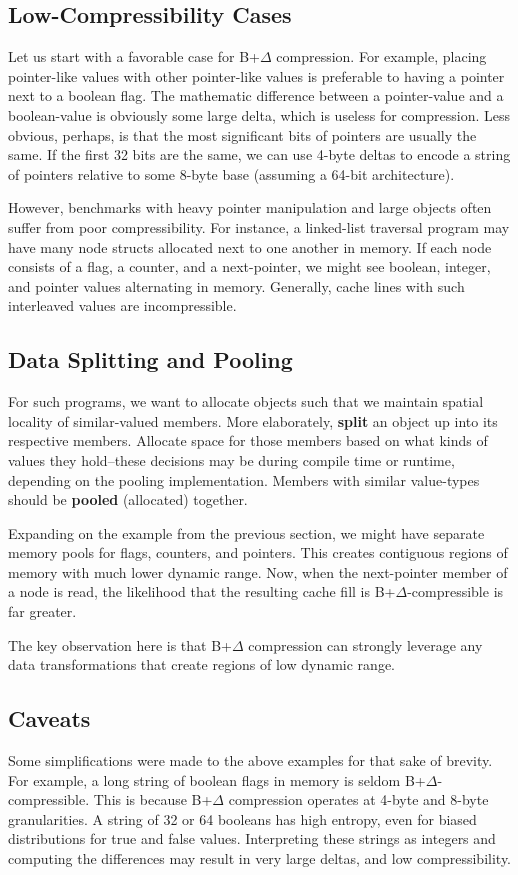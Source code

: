 \documentclass[pageno]{jpaper}
\begin{document}
\subsection{Low-Compressibility Cases}

Let us start with a favorable case for B+$\Delta$ compression. For example, placing pointer-like values with other pointer-like values is preferable to having a pointer next to a boolean flag. The mathematic difference between a pointer-value and a boolean-value is obviously some large delta, which is useless for compression.  Less obvious, perhaps, is that the most significant bits of pointers are usually the same. If the first 32 bits are the same, we can use 4-byte deltas to encode a string of pointers relative to some 8-byte base (assuming a 64-bit architecture).

However, benchmarks with heavy pointer manipulation and large objects often suffer from poor compressibility. For instance, a linked-list traversal program may have many node structs allocated next to one another in memory. If each node consists of a flag, a counter, and a next-pointer, we might see boolean, integer, and pointer values alternating in memory. Generally, cache lines with such interleaved values are incompressible.


\subsection{Data Splitting and Pooling}
 For such programs, we want to allocate objects such that we maintain spatial locality of similar-valued members. More elaborately, \textbf{split} an object up into its respective members. Allocate space for those members based on what kinds of values they hold--these decisions may be during compile time or runtime, depending on the pooling implementation. Members with similar value-types should be \textbf{pooled} (allocated) together.

Expanding on the example from the previous section, we might have separate memory pools for flags, counters, and pointers. This creates contiguous regions of memory with much lower dynamic range. Now, when the next-pointer member of a node is read, the likelihood that the resulting cache fill is B+$\Delta$-compressible is far greater.

The key observation here is that B+$\Delta$ compression  can strongly leverage any data transformations that create regions of low dynamic range.


\subsection{Caveats}
Some simplifications were made to the above examples for that sake of brevity. For example, a long string of boolean flags in memory is seldom B+$\Delta$-compressible. This is because B+$\Delta$ compression operates at 4-byte and 8-byte granularities. A string of 32 or 64 booleans has high entropy, even for biased distributions for true and false values. Interpreting these strings as integers and computing the differences may result in very large deltas, and low compressibility.




\end{document}
